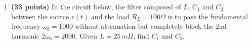 \begin{enumerate}
\begin{enumerate}

  \begin{comment}
  {\bf Solution} The total admittance is
  \begin{eqnarray}
    Y(\omega)&=&\frac{1}{j\omega L+1/j\omega C}+j\omega C_0
    =\frac{j\omega C}{1-\omega^2LC}+j\omega C_0
    =\frac{j\omega C+j\omega C_0(1-\omega^2LC)}{1-\omega^2LC}
    \nonumber
  \end{eqnarray}
  \begin{itemize}
    \item The magnitude of $Y(\omega)$ is minimized to zero if
      \[
      j\omega C+j\omega C_0(1-\omega^2LC)=0
      \]
      i.e.,
      \[
      \omega^2=\frac{C+C_0}{L(CC_0)},\;\;\;\;\;\mbox{or}
      \;\;\;\;\omega=\frac{1}{\sqrt{LC_p}}
      \]
      where 
      \[ 
      C_p=C||C_0=\frac{CC_0}{C+C_0}
      \]
      This is the parallel resonant frequency.
    \item The magnitude of $Y(\omega)$ is maximized to infinity if
      $\omega=1/\sqrt{LC}$ and the denominator becomes zero. This is
      the series resonant frequency.
  \end{itemize}
  \end{comment}


\item {\bf (33 points)} 
  In the circuit below, the filter composed of $L$, $C_1$ and $C_2$
  between the source $v(t)$ and the load $R_L=100\Omega$ is to pass the 
  fundamental frequency $\omega_0=1000$ without attenuation but completely 
  block the 2nd harmonic $2\omega_0=2000$. Given $L=25\,mH$, find $C_1$
  and $C_2$.


  \begin{comment}
  {\bf Solution} Find the total impedance of the filter branch:
  \begin{eqnarray}
    Z(\omega)&=&\frac{j\omega L/j\omega C_1}{j\omega L+1/j\omega C_1}+\frac{1}{j\omega C_2}
    =\frac{j\omega L}{1-\omega^2LC_1}-\frac{j}{\omega C_2}
    \nonumber\\
    &=&j\frac{\omega^2LC_2+\omega^2LC_1-1}{(1-\omega^2LC_1)\omega C_2}
    =j\frac{\omega^2L(C_1+C_2)-1}{(1-\omega^2LC_1)\omega C_2}
    \nonumber
  \end{eqnarray}
  When the denominator is zero, i.e., $\omega^2=1/LC_1$, we get 
  $|Z(\omega)|=\infty$, the filter is an open circuit. Therefore, to 
  completely block $2\omega_0=2000$, $C_1$ needs to satisfy:
  \[
  \frac{1}{\sqrt{LC_1}}=2\times 10^3,\;\;\;\;\mbox{i.e.,}\;\;\;\;
  C_1=\frac{1}{4\times 10^6 \times 25\times 10^-3}=10^{-5}\,F=10\,\mu F
  \]
  When the numerator is zero, i.e., $\omega^2L(C_1+C_2)=1$,  $|Z(\omega)|=0$,
  the filter is a short circuit. Therefore, to pass $\omega_0=1000$ without
  attenuation, $C_1+C_2$ needs to satisfy
  \[
  C_1+C_2=\frac{1}{\omega_0^2L}=\frac{1}{10^6\times 25\times 10^{-3}}=40\times 10^{-6}=40\,\mu F
  \]
  i.e.,
  \[
  C_2=40\,\mu F-C_1=40\,\mu F-10\,\mj F=30\,\mu F
  \]
  \end{comment}


\end{enumerate}
\end{enumerate}
